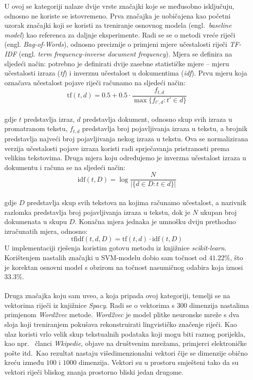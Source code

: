 \documentclass[times, utf8, zavrsni]{fer}
\begin{document}
U ovoj se kategoriji nalaze dvije vrste značajki koje se međusobno isključuju, odnosno ne koriste se istovremeno. Prva značajka je uobičajena kao početni uzorak značajki koji se koristi za treniranje osnovnog modela (engl.~\emph{baseline model}) kao referenca za daljnje eksperimente. Radi se 
se o metodi vreće riječi (engl. \emph{Bag-of-Words}), odnosno preciznije o primjeni mjere učestalosti riječi \emph{TF-IDF} (engl. \emph{term  frequency-inverse  document  frequency}). Mjera se definira na sljedeći način: potrebno je definirati dvije zasebne statističke mjere -- mjeru učestalosti izraza (\emph{tf}) i inverznu učestalost u dokumentima (\emph{idf}). Prvu mjeru koja označava učestalost pojave riječi računamo na sljedeći način: \[ \mathrm{tf}(t,d) = 0.5 + 0.5 \cdot  \frac{f_{t, d}}{\max\{f_{t', d}:t' \in d\}}\]
\noindent\\
gdje $t$ predstavlja izraz, $d$ predstavlja dokument, odnosno skup svih izraza u promatranom tekstu, $f_{t,d}$ predstavlja broj pojavljivanja izraza u tekstu, a brojnik predstavlja najveći broj pojavljivanja nekog izraza u tekstu. Ova se normalizirana verzija učestalosti pojave izraza koristi radi sprječavanja pristranosti prema velikim tekstovima.
Druga mjera koju određujemo je inverzna učestalost izraza u dokumentu i računa se na sljedeći način:
\[ \mathrm{idf}(t, D) =  \log \frac{N}{|\{d \in D: t \in d\}|} \]
\noindent\\
gdje $D$ predstavlja skup svih tekstova na kojima računamo učestalost, a nazivnik razlomka predstavlja broj pojavljivanja izraza u tekstu, dok je $N$ ukupan broj dokumenata u skupu $D$.
Konačna mjera jednaka je umnošku dviju prethodno izračunatih mjera, odnosno: \[ {\displaystyle \mathrm {tfidf} (t,d,D)=\mathrm {tf} (t,d)\cdot \mathrm {idf} (t,D)} \]
\noindent
U implementaciji rješenja koristim gotovu metodu iz knjižnice \emph{scikit-learn}. Korištenjem nastalih značajki u \gls{SVM}-modelu dobio sam točnost od $41.22\%$, što je korektan osnovni model s obzirom na točnost nasumičnog odabira koja iznosi $33.3\%$.\\\\
Druga značajka koju sam uveo, a koja pripada ovoj kategoriji, temelji se na vektorima riječi iz knjižnice \emph{Spacy}. Radi se o vektorima s 300 dimenzija nastalima primjenom \emph{Word2vec} \citep{w2v} metode. \emph{Word2vec} je model plitke neuronske mreže s dva sloja koji treniranjem pokušava rekonstruirati lingvističko značenje riječi. Kao ulaz koristi vrlo velik skup tekstualnih podataka koji mogu biti raznog porijekla, kao npr.~ članci \emph{Wkipedie}, objave na društvenim mrežama, primjerci elektroničke pošte itd.~Kao rezultat nastaju višedimenzionalni vektori čije se dimenzije obično kreću između $100$ i $1000$ dimenzija. Vektori su u prostoru smješteni tako da su vektori riječi bliskog znanja prostorno bliski jedan drugome.\\
\end{document}
